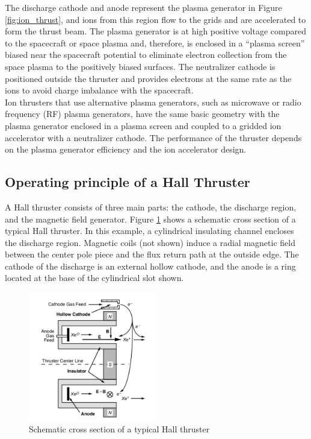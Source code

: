 \documentclass[11pt]{article}
\begin{document}
The discharge cathode and anode represent the plasma generator in Figure \ref{fig:ion_thrust}, and ions from this region flow to the grids and are accelerated to form the thrust beam. The plasma generator is at high positive voltage compared to the spacecraft or space plasma and, therefore, is enclosed in a “plasma screen” biased near the spacecraft potential to eliminate electron collection from the space plasma to the positively biased surfaces. The neutralizer cathode is positioned outside the thruster and provides electrons at the same rate as the ions to avoid charge imbalance with the spacecraft.\\

Ion thrusters that use alternative plasma generators, such as microwave or radio frequency (RF) plasma generators, have the same basic geometry with the plasma generator enclosed in a plasma screen and coupled to a gridded ion accelerator with a neutralizer cathode. The performance of the thruster depends on the plasma generator efficiency and the ion accelerator design.

\pagebreak
\subsection{Operating principle of a Hall Thruster}

A Hall thruster consists of three main parts: the cathode, the discharge region, and the magnetic field generator. Figure \ref{fig:hall_thruster} shows a schematic cross section of a typical Hall thruster. In this example, a cylindrical insulating channel encloses the discharge region. Magnetic coils (not shown) induce a radial magnetic field between the center pole piece and the flux return path at the outside edge. The cathode of the discharge is an external hollow cathode, and the anode is a ring located at the base of the cylindrical slot shown.\\

\begin{figure}[h!]
\centering
\includegraphics[width= 0.5\textwidth]{hall_thruster}
\caption{\label{fig:hall_thruster} Schematic cross section of a typical Hall thruster \cite{goebel}}
\end{figure}
\end{document}
